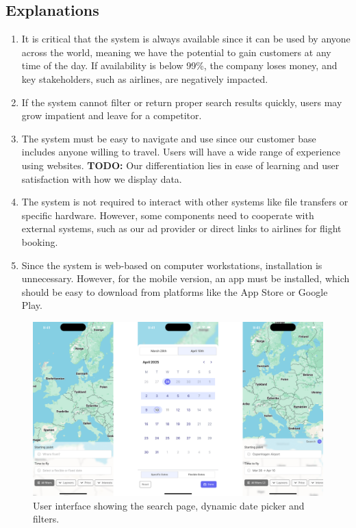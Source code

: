 \subsection*{Explanations}
\begin{enumerate}
    \item It is critical that the system is always available since it can be used by anyone across the world, meaning we have the potential to gain customers at any time of the day. If availability is below 99\%, the company loses money, and key stakeholders, such as airlines, are negatively impacted.
    \item If the system cannot filter or return proper search results quickly, users may grow impatient and leave for a competitor.
    \item The system must be easy to navigate and use since our customer base includes anyone willing to travel. Users will have a wide range of experience using websites. \textbf{TODO:} Our differentiation lies in ease of learning and user satisfaction with how we display data.
    \item The system is not required to interact with other systems like file transfers or specific hardware. However, some components need to cooperate with external systems, such as our ad provider or direct links to airlines for flight booking.
    \item Since the system is web-based on computer workstations, installation is unnecessary. However, for the mobile version, an app must be installed, which should be easy to download from platforms like the App Store or Google Play.
\end{enumerate}

\newpage
\begin{figure}[h]
    \includegraphics[width=.89\textwidth]{resources/mockup1.png}
    \caption{User interface showing the search page, dynamic date picker and filters.}
    \label{fig:mockup1}
\end{figure}

